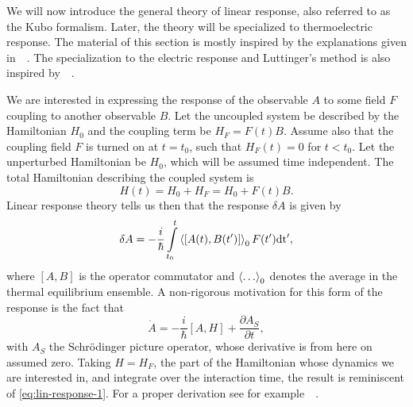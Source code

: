 We will now introduce the general theory of linear response, also referred to as the Kubo formalism.
Later, the theory will be specialized to thermoelectric response.
The material of this section is mostly inspired by the explanations given in~\citeauthor{giulianiQuantumTheoryElectron2005}~\cite{giulianiQuantumTheoryElectron2005}.
The specialization to the electric response and Luttinger's method is also inspired by~\citeauthor{mahanManyparticlePhysics2000}~\cite{mahanManyparticlePhysics2000}.

We are interested in expressing the response of the observable ${A}$ to some field $F$ coupling to another observable ${B}$.
Let the uncoupled system be described by the Hamiltonian $H_{0}$ and the coupling term be $H_F = F(t) {B}$.
Assume also that the coupling field $F$ is turned on at $t=t_0$,  such that $H_F(t) = 0$ for $t < t_0$.
Let the unperturbed Hamiltonian be $H_0$, which will be assumed time independent.
The total Hamiltonian describing the coupled system is
\begin{equation}
  \label{eq:kubo-perturbation}
{H}(t) = H_0 + H_F = H_0+ F(t) {B}.
\end{equation}
Linear response theory tells us then that the response $\delta {A}$ is given by~\cite{giulianiQuantumTheoryElectron2005}
\begin{equation}\label{eq:lin-response-1}
  \delta {A} = -\frac{i}{\hbar} \int\limits_{t_0}^t
  \Braket{\left[
{A}(t), {B}(t')
\right]}_{0}
F(t') \mathrm{dt'},
\end{equation}
where $[{A}, {B}]$ is the operator commutator and $\braket{\dots}_0$ denotes the average in the thermal equilibrium ensemble.
A  non-rigorous motivation for this form of the response is the fact that
\begin{equation}
  \dot{{A}} = -\frac{i}{\hbar } \left[ {A}, H \right]
  + \frac{\partial {A}_{S}}{\partial t}, 
\end{equation}
with $A_S$ the Schrödinger picture operator, whose derivative is from here on assumed zero.
Taking $H=H_F$, the part of the Hamiltonian whose dynamics we are interested in, and integrate over the interaction time, the result is reminiscent of \cref{eq:lin-response-1}.
For a proper derivation see for example~\citeauthor{giulianiQuantumTheoryElectron2005}~\cite[Chapter 3.3]{giulianiQuantumTheoryElectron2005}.

